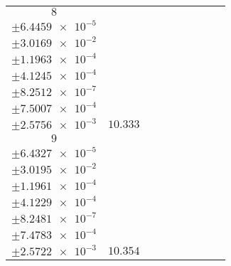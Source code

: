 \documentclass[8pt]{article}
\begin{document}
\begin{longtable}[l]{c c c c c c c c c}
$\num{8}$ & \begin{tabular}[c]{@{}c@{}}$\num{0.12294}$ \\ $\pm\num{6.4459e-5}$\end{tabular} & \begin{tabular}[c]{@{}c@{}}$\num{-0.31052}$ \\ $\pm\num{3.0169e-2}$\end{tabular} & \begin{tabular}[c]{@{}c@{}}$\num{-5.2045}$ \\ $\pm\num{1.1963e-4}$\end{tabular} & \begin{tabular}[c]{@{}c@{}}$\num{1.9244e+3}$ \\ $\pm\num{4.1245e-4}$\end{tabular} & \begin{tabular}[c]{@{}c@{}}$\num{3.8498}$ \\ $\pm\num{8.2512e-7}$\end{tabular} & \begin{tabular}[c]{@{}c@{}}$\num{1.1775}$ \\ $\pm\num{7.5007e-4}$\end{tabular} & \begin{tabular}[c]{@{}c@{}}$\num{4.2414}$ \\ $\pm\num{2.5756e-3}$\end{tabular} & $\num{10.333}$\\
$\num{9}$ & \begin{tabular}[c]{@{}c@{}}$\num{0.12277}$ \\ $\pm\num{6.4327e-5}$\end{tabular} & \begin{tabular}[c]{@{}c@{}}$\num{0.21548}$ \\ $\pm\num{3.0195e-2}$\end{tabular} & \begin{tabular}[c]{@{}c@{}}$\num{5.205}$ \\ $\pm\num{1.1961e-4}$\end{tabular} & \begin{tabular}[c]{@{}c@{}}$\num{1.9348e+3}$ \\ $\pm\num{4.1229e-4}$\end{tabular} & \begin{tabular}[c]{@{}c@{}}$\num{3.8706}$ \\ $\pm\num{8.2481e-7}$\end{tabular} & \begin{tabular}[c]{@{}c@{}}$\num{1.1752}$ \\ $\pm\num{7.4783e-4}$\end{tabular} & \begin{tabular}[c]{@{}c@{}}$\num{4.2377}$ \\ $\pm\num{2.5722e-3}$\end{tabular} & $\num{10.354}$\\

\end{longtable}
\end{document}
